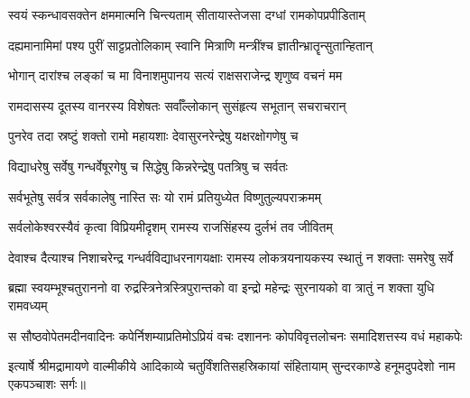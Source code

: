 \twolineshloka
{स्वयं स्कन्धावसक्तेन क्षममात्मनि चिन्त्यताम्}
{सीतायास्तेजसा दग्धां रामकोपप्रपीडिताम्}

\twolineshloka
{दह्यमानामिमां पश्य पुरीं साट्टप्रतोलिकाम्}
{स्वानि मित्राणि मन्त्रींश्च ज्ञातीन्भ्रातॄन्सुतान्हितान्}

\twolineshloka
{भोगान् दारांश्च लङ्कां च मा विनाशमुपानय}
{सत्यं राक्षसराजेन्द्र शृणुष्व वचनं मम}

\twolineshloka
{रामदासस्य दूतस्य वानरस्य विशेषतः}
{सर्वाँल्लोकान् सुसंहृत्य सभूतान् सचराचरान्}

\twolineshloka
{पुनरेव तदा स्रष्टुं शक्तो रामो महायशाः}
{देवासुरनरेन्द्रेषु यक्षरक्षोगणेषु च}

\twolineshloka
{विद्याधरेषु सर्वेषु गन्धर्वेषूरगेषु च}
{सिद्धेषु किन्नरेन्द्रेषु पतत्रिषु च सर्वतः}

\twolineshloka
{सर्वभूतेषु सर्वत्र सर्वकालेषु नास्ति सः}
{यो रामं प्रतियुध्येत विष्णुतुल्यपराक्रमम्}

\twolineshloka
{सर्वलोकेश्वरस्यैवं कृत्वा विप्रियमीदृशम्}
{रामस्य राजसिंहस्य दुर्लभं तव जीवितम्}

\fourlineindentedshloka
{देवाश्च दैत्याश्च निशाचरेन्द्र}
{गन्धर्वविद्याधरनागयक्षाः}
{रामस्य लोकत्रयनायकस्य}
{स्थातुं न शक्ताः समरेषु सर्वे}

\fourlineindentedshloka
{ब्रह्मा स्वयम्भूश्चतुराननो वा}
{रुद्रस्त्रिनेत्रस्त्रिपुरान्तको वा}
{इन्द्रो महेन्द्रः सुरनायको वा}
{त्रातुं न शक्ता युधि रामवध्यम्}

\fourlineindentedshloka
{स सौष्ठवोपेतमदीनवादिनः}
{कपेर्निशम्याप्रतिमोऽप्रियं वचः}
{दशाननः कोपविवृत्तलोचनः}
{समादिशत्तस्य वधं महाकपेः}

इत्यार्षे श्रीमद्रामायणे वाल्मीकीये आदिकाव्ये चतुर्विंशतिसहस्रिकायां संहितायाम् सुन्दरकाण्डे हनूमदुपदेशो नाम एकपञ्चाशः सर्गः॥

\closesection